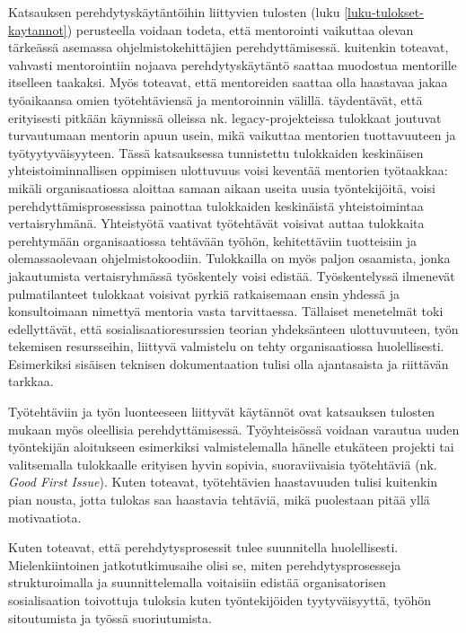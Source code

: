 \documentclass[utf8]{gradu3}
\begin{document}
Katsauksen perehdytyskäytäntöihin liittyvien tulosten (luku \ref{luku-tulokset-kaytannot}) perusteella voidaan todeta, että mentorointi vaikuttaa olevan tärkeässä asemassa ohjelmistokehittäjien perehdyttämisessä. \textcite{viviani-murphy-2019} kuitenkin toteavat, vahvasti mentorointiin nojaava perehdytyskäytäntö saattaa muodostua mentorille itselleen taakaksi. Myös \textcite{moe-ym-2020} toteavat, että mentoreiden saattaa olla haastavaa jakaa työaikaansa omien työtehtäviensä ja mentoroinnin välillä. \textcite{britto-ym-2017} täydentävät, että erityisesti pitkään käynnissä olleissa nk. legacy-projekteissa tulokkaat joutuvat turvautumaan mentorin apuun usein, mikä vaikuttaa mentorien tuottavuuteen ja työtyytyväisyyteen. Tässä katsauksessa tunnistettu tulokkaiden keskinäisen yhteistoiminnallisen oppimisen ulottuvuus voisi keventää mentorien työtaakkaa: mikäli organisaatiossa aloittaa samaan aikaan useita uusia työntekijöitä, voisi perehdyttämisprosessissa painottaa tulokkaiden keskinäistä yhteistoimintaa vertaisryhmänä. Yhteistyötä vaativat työtehtävät voisivat auttaa tulokkaita perehtymään organisaatiossa tehtävään työhön, kehitettäviin tuotteisiin ja olemassaolevaan ohjelmistokoodiin. Tulokkailla on myös paljon osaamista, jonka jakautumista vertaisryhmässä työskentely voisi edistää. Työskentelyssä ilmenevät pulmatilanteet tulokkaat voisivat pyrkiä ratkaisemaan ensin yhdessä ja konsultoimaan nimettyä mentoria vasta tarvittaessa. Tällaiset menetelmät toki edellyttävät, että sosialisaatioresurssien teorian yhdeksänteen ulottuvuuteen, työn tekemisen resursseihin, liittyvä valmistelu on tehty organisaatiossa huolellisesti. Esimerkiksi sisäisen teknisen dokumentaation tulisi olla ajantasaista ja riittävän tarkkaa.

Työtehtäviin ja työn luonteeseen liittyvät käytännöt ovat katsauksen tulosten mukaan myös oleellisia perehdyttämisessä. Työyhteisössä voidaan varautua uuden työntekijän aloitukseen esimerkiksi valmistelemalla hänelle etukäteen projekti tai valitsemalla tulokkaalle erityisen hyvin sopivia, suoraviivaisia työtehtäviä (nk. \textit{Good First Issue}). Kuten \textcite{ju-ym-2021} toteavat, työtehtävien haastavuuden tulisi kuitenkin pian nousta, jotta tulokas saa haastavia tehtäviä, mikä puolestaan pitää yllä motivaatiota.

Kuten \textcite{britto-ym-2020} toteavat, että perehdytysprosessit tulee suunnitella huolellisesti. Mielenkiintoinen jatkotutkimusaihe olisi se, miten perehdytysprosesseja strukturoimalla ja suunnittelemalla voitaisiin edistää organisatorisen sosialisaation toivottuja tuloksia kuten työntekijöiden tyytyväisyyttä, työhön sitoutumista ja työssä suoriutumista.
\end{document}
